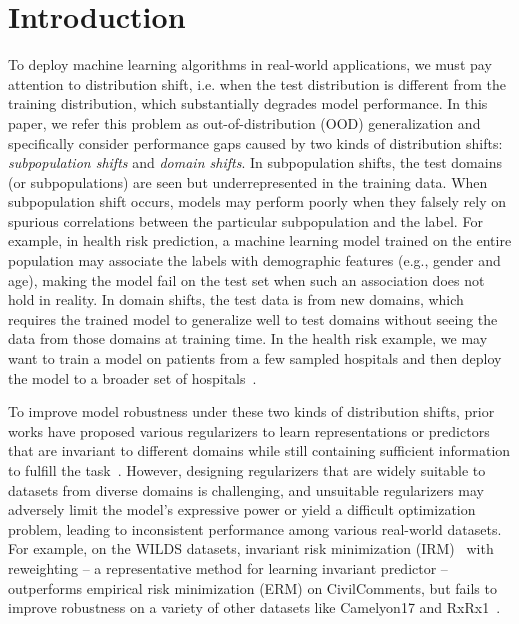 \section{Introduction}
To deploy machine learning algorithms in real-world applications, we must pay attention to distribution shift, i.e. when the test distribution is different from the training distribution, which substantially degrades model performance. In this paper, we refer this problem as out-of-distribution (OOD) generalization and specifically consider performance gaps caused by two kinds of distribution shifts: \emph{subpopulation shifts} and \emph{domain shifts}. In subpopulation shifts, the test domains (or subpopulations) are seen but underrepresented in the training data. When subpopulation shift occurs, models may perform poorly when they falsely rely on spurious correlations between the particular subpopulation and the label. For example, in health risk prediction, a machine learning model trained on the entire population may associate the labels with demographic features (e.g., gender and age), making the model fail on the test set when such an association does not hold in reality. In domain shifts, the test data is from new domains, which requires the trained model to generalize well to test domains without seeing the data from those domains at training time. In the health risk example, we may want to train a model on patients from a few sampled hospitals and then deploy the model to a broader set of hospitals~\citep{koh2021wilds}. 

To improve model robustness under these two kinds of distribution shifts, prior works have proposed various regularizers to learn representations or predictors that are invariant to different domains while still containing sufficient information to fulfill the task~\citep{li2018domain,sun2016deep,arjovsky2019invariant,krueger2021out,rosenfeld2020risks}. However, designing regularizers that are widely suitable to datasets from diverse domains is challenging, and unsuitable regularizers may adversely limit the model's expressive power or yield a difficult optimization problem, leading to inconsistent performance among various real-world datasets. For example, on the WILDS datasets, invariant risk minimization (IRM)~\citep{arjovsky2019invariant} with reweighting -- a representative method for learning invariant predictor -- outperforms empirical risk minimization (ERM) on CivilComments, but fails to improve robustness on a variety of other datasets like Camelyon17 and RxRx1~\citep{koh2021wilds}. 

